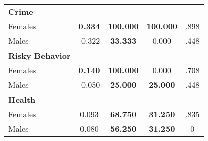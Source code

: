 \begin{tabular}{l c c c c}
\midrule
\textbf{Crime} & & & & \\
\quad Females &  \textbf{    0.334} & \textbf{  100.000} & \textbf{  100.000} & .898 \\
\quad Males &     -0.322 & \textbf{   33.333} &     0.000 & .448 \\
\midrule
\textbf{Risky Behavior} & & & & \\
\quad Females &  \textbf{    0.140} & \textbf{  100.000} &     0.000 & .708 \\
\quad Males &     -0.050 & \textbf{   25.000} & \textbf{   25.000} & .448 \\
\midrule
\textbf{Health} & & & & \\
\quad Females &      0.093 & \textbf{   68.750} & \textbf{   31.250} & .835 \\
\quad Males &      0.080 & \textbf{   56.250} & \textbf{   31.250} & 0 \\
\bottomrule
\end{tabular}
